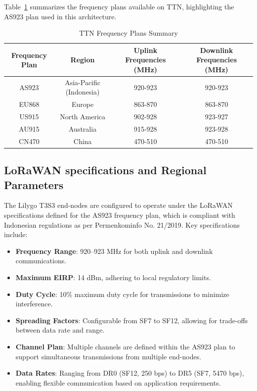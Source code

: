 Table~\ref{tab:TTN_frequency_plans} summarizes the frequency plans available on TTN, highlighting the AS923 plan used in this architecture.
\begin{table}[htbp]
    \centering
    \caption{TTN Frequency Plans Summary}
    \label{tab:TTN_frequency_plans}
    \begin{tabular}{|c|c|c|c|}
        \hline
        \textbf{Frequency Plan} & \textbf{Region}          & \textbf{Uplink Frequencies (MHz)} & \textbf{Downlink Frequencies (MHz)} \\ \hline
        AS923                   & Asia-Pacific (Indonesia) & 920-923                           & 920-923                             \\ \hline
        EU868                   & Europe                   & 863-870                           & 863-870                             \\ \hline
        US915                   & North America            & 902-928                           & 923-927                             \\ \hline
        AU915                   & Australia                & 915-928                           & 923-928                             \\ \hline
        CN470                   & China                    & 470-510                           & 470-510                             \\ \hline
    \end{tabular}
\end{table}

\subsection{LoRaWAN specifications and Regional Parameters}
The Lilygo T3S3 end-nodes are configured to operate under the LoRaWAN specifications defined for the AS923 frequency plan, which is compliant with Indonesian regulations as per Permenkominfo No. 21/2019. Key specifications include:
\begin{itemize}
    \item \textbf{Frequency Range}: 920–923 MHz for both uplink and downlink communications.
    \item \textbf{Maximum EIRP}: 14 dBm, adhering to local regulatory limits.
    \item \textbf{Duty Cycle}: 10\% maximum duty cycle for transmissions to minimize interference.
    \item \textbf{Spreading Factors}: Configurable from SF7 to SF12, allowing for trade-offs between data rate and range.
    \item \textbf{Channel Plan}: Multiple channels are defined within the AS923 plan to support simultaneous transmissions from multiple end-nodes.
    \item \textbf{Data Rates}: Ranging from DR0 (SF12, 250 bps) to DR5 (SF7, 5470 bps), enabling flexible communication based on application requirements.
\end{itemize}


